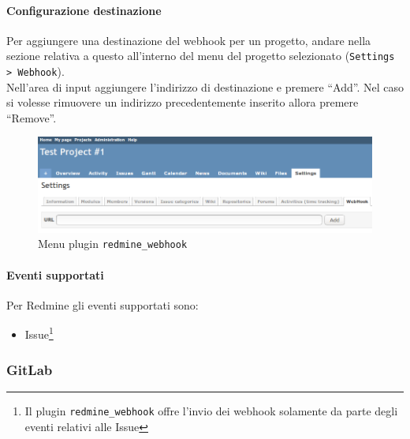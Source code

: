 	\paragraph{Configurazione destinazione}
	Per aggiungere una destinazione del webhook per un progetto, andare nella sezione relativa a questo all'interno del menu del progetto selezionato (\texttt{Settings > Webhook}).\\
	Nell'area di input aggiungere l'indirizzo di destinazione e premere ``Add''. Nel caso si volesse rimuovere un indirizzo precedentemente inserito allora premere ``Remove''.
	\begin{figure}[H]
		\centering
		\includegraphics[width=13cm]{img/redmine_webhook_menu.png}
		\caption{Menu plugin \texttt{redmine\_webhook}}
	\end{figure}	
	\paragraph{Eventi supportati}
	Per Redmine gli eventi supportati sono:
	\begin{itemize}
		\item Issue\footnote{Il plugin \texttt{redmine\_webhook} offre l'invio dei webhook solamente da parte degli eventi relativi alle Issue}
	\end{itemize}

	\subsubsection{GitLab}
